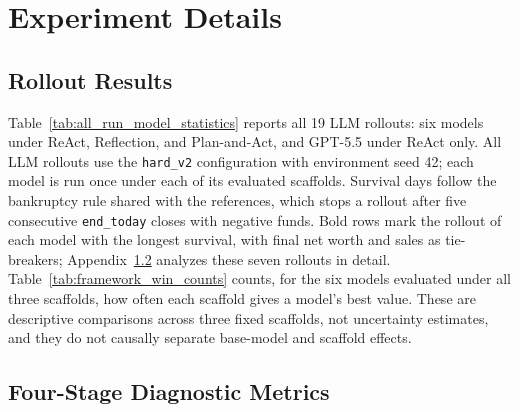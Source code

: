 \section{Experiment Details}
\label{appendix:experiment_details}

\subsection{Rollout Results}
\label{appendix:rollout_results}

Table~\ref{tab:all_run_model_statistics} reports all 19 LLM rollouts: six models under ReAct, Reflection, and Plan-and-Act, and GPT-5.5 under ReAct only. All LLM rollouts use the \texttt{hard\_v2} configuration with environment seed 42; each model is run once under each of its evaluated scaffolds. Survival days follow the bankruptcy rule shared with the references, which stops a rollout after five consecutive \texttt{end\_today} closes with negative funds. Bold rows mark the rollout of each model with the longest survival, with final net worth and sales as tie-breakers; Appendix~\ref{appendix:stage_metrics} analyzes these seven rollouts in detail. Table~\ref{tab:framework_win_counts} counts, for the six models evaluated under all three scaffolds, how often each scaffold gives a model's best value. These are descriptive comparisons across three fixed scaffolds, not uncertainty estimates, and they do not causally separate base-model and scaffold effects.




\subsection{Four-Stage Diagnostic Metrics}
\label{appendix:stage_metrics}

